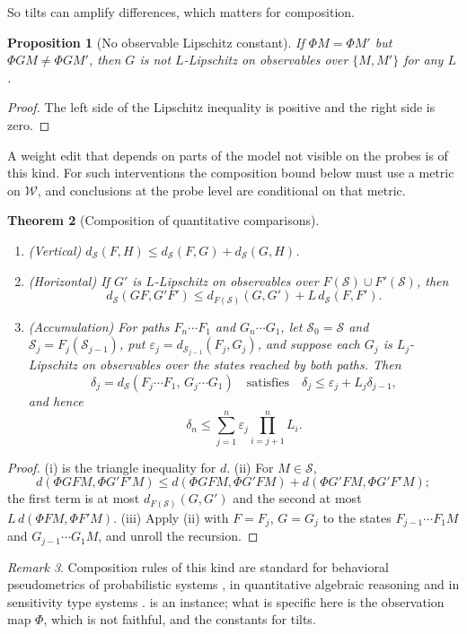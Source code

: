 \documentclass[11pt]{article}
\newtheorem{theorem}{Theorem}[section]
\newtheorem{proposition}[theorem]{Proposition}
\theoremstyle{definition}
\theoremstyle{remark}
\newtheorem{remark}[theorem]{Remark}
\newcommand{\cW}{\mathcal{W}}
\newcommand{\cS}{\mathcal{S}}
\begin{document}
So tilts can amplify differences, which matters for composition.

\begin{proposition}[No observable Lipschitz constant]\label{prop:nonfaithful}
If $\Phi M=\Phi M'$ but $\Phi GM\ne\Phi GM'$, then $G$ is not $L$-Lipschitz on observables over
$\{M,M'\}$ for any $L$.
\end{proposition}
\begin{proof}
The left side of the Lipschitz inequality is positive and the right side is zero.
\end{proof}

A weight edit that depends on parts of the model not visible on the probes is of this kind. For such
interventions the composition bound below must use a metric on $\cW$, and conclusions at the probe
level are conditional on that metric.

\begin{theorem}[Composition of quantitative comparisons]\label{thm:composition}
\leavevmode
\begin{enumerate}[label=(\roman*)]
\item (Vertical) $d_\cS(F,H)\le d_\cS(F,G)+d_\cS(G,H)$.
\item (Horizontal) If $G'$ is $L$-Lipschitz on observables over $F(\cS)\cup F'(\cS)$, then
  \[
  d_\cS(GF,G'F')\le d_{F(\cS)}(G,G')+L\,d_\cS(F,F').
  \]
\item (Accumulation) For paths $F_n\cdots F_1$ and $G_n\cdots G_1$, let $\cS_0=\cS$ and
  $\cS_j=F_j(\cS_{j-1})$, put $\varepsilon_j=d_{\cS_{j-1}}(F_j,G_j)$, and suppose each $G_j$ is
  $L_j$-Lipschitz on observables over the states reached by both paths. Then
  \[
  \delta_j=d_\cS(F_j\cdots F_1,\,G_j\cdots G_1)\quad\text{satisfies}\quad
  \delta_j\le\varepsilon_j+L_j\delta_{j-1},
  \]
  and hence
  \[
  \delta_n\le\sum_{j=1}^n\varepsilon_j\prod_{i=j+1}^nL_i .
  \]
\end{enumerate}
\end{theorem}
\begin{proof}
(i) is the triangle inequality for $d$. (ii) For $M\in\cS$,
\[
d(\Phi GFM,\Phi G'F'M)\le d(\Phi GFM,\Phi G'FM)+d(\Phi G'FM,\Phi G'F'M);
\]
the first term is at most $d_{F(\cS)}(G,G')$ and the second at most $L\,d(\Phi FM,\Phi F'M)$. (iii) Apply (ii) with $F=F_j$, $G=G_j$ to the states $F_{j-1}\cdots F_1M$
and $G_{j-1}\cdots G_1M$, and unroll the recursion.
\end{proof}

\begin{remark}
Composition rules of this kind are standard for behavioral pseudometrics of probabilistic systems
\cite{Desharnais2004}, in quantitative algebraic reasoning \cite{MPP2016} and in sensitivity type
systems \cite{ReedPierce2010}.  is an instance; what is specific here is the
observation map $\Phi$, which is not faithful, and the constants for tilts.
\end{remark}
\end{document}
